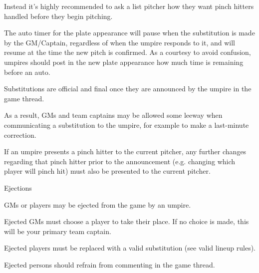 \begin{deepEnumerate}
\begin{deepEnumerate}
\begin{deepEnumerate}
			Instead it’s highly recommended to ask a list pitcher how they want pinch hitters handled before they begin pitching.
			\item The auto timer for the plate appearance will pause when the substitution is made by the GM/Captain, 
			regardless of when the umpire responds to it, 
			and will resume at the time the new pitch is confirmed. 
			As a courtesy to avoid confusion, 
			umpires should post in the new plate appearance how much time is remaining before an auto.
		\end{deepEnumerate}
		\item Substitutions are official and final once they are announced by the umpire in the game thread.
		\begin{deepEnumerate}
			\item As a result, GMs and team captains may be allowed some leeway when communicating a substitution to the umpire, 
			for example to make a last-minute correction.
			\item If an umpire presents a pinch hitter to the current pitcher, 
			any further changes regarding that pinch hitter prior to the announcement 
			(e.g. changing which player will pinch hit) 
			must also be presented to the current pitcher.
		\end{deepEnumerate}
	\end{deepEnumerate}
	\item Ejections
	\begin{deepEnumerate}
		\item GMs or players may be ejected from the game by an umpire.
		\begin{deepEnumerate}
			\item Ejected GMs must choose a player to take their place. If no choice is made, this will be your primary team captain.
			\item Ejected players must be replaced with a valid substitution (see valid lineup rules).
			\item Ejected persons should refrain from commenting in the game thread.
		\end{deepEnumerate}
	\end{deepEnumerate}
\end{deepEnumerate}
